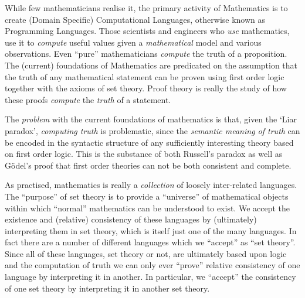 

  

While few mathematicians realise it, the primary activity of Mathematics is to
create (Domain Specific) Computational Languages, otherwise known as Programming
Languages. Those scientists and engineers who \emph{use} mathematics, use it to
\emph{compute} useful values given a \emph{mathematical} model and
various observations. Even ``pure'' mathematicians \emph{compute} the truth of a
proposition. The (current) foundations of Mathematics are predicated on the
assumption that the truth of any mathematical statement can be proven using
first order logic together with the axioms of set theory. Proof theory is really
the study of how these proofs \emph{compute} the \emph{truth} of a statement.

The \emph{problem} with the current foundations of mathematics is that, given
the `Liar paradox', \emph{computing truth} is problematic, since the
\emph{semantic meaning of truth} can be encoded in the syntactic structure of
any sufficiently interesting theory based on first order logic. This is the
substance of both Russell's paradox as well as G\"odel's proof that first order
theories can not be both consistent and complete.

As practised, mathematics is really a \emph{collection} of loosely inter-related
languages. The ``purpose'' of set theory is to provide a ``universe'' of
mathematical objects within which ``normal'' mathematics can be understood to
exist. We accept the existence and (relative) consistency of these languages by
(ultimately) interpreting them in set theory, which is itself just one of the
many languages. In fact there are a number of different languages which we
``accept'' as ``set theory''. Since all of these languages, set theory or not,
are ultimately based upon logic and the computation of truth we can only ever
``prove'' relative consistency of one language by interpreting it in another. In
particular, we ``accept'' the consistency of one set theory by interpreting it
in another set theory.


